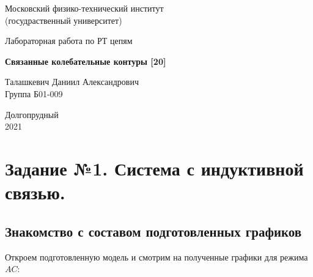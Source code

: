 \documentclass[a4paper, 14pt]{extarticle}%
\date{}
\begin{document}
\begin{titlepage}

	\newpage
	\begin{center}
		\normalsize Московский физико-технический институт \\(госудраственный 			университет)
	\end{center}

	\vspace{6em}

	\begin{center}
		\Large Лабораторная работа по РТ цепям\\
	\end{center}

	\vspace{1em}

	\begin{center}
		\large \textbf{Связанные колебательные контуры [20]}
	\end{center}

	\vspace{2em}

	\begin{center}
		\large Талашкевич Даниил Александрович\\
		Группа Б01-009
	\end{center}

	\vspace{\fill}

	\begin{center}
	Долгопрудный \\2021
	\end{center}
	
\end{titlepage}

	\thispagestyle{empty}
	\newpage
	\tableofcontents
	\newpage
	\setcounter{page}{1}


\section{Задание №1. Система с индуктивной связью.}

\subsection{Знакомство с составом подготовленных графиков}

Откроем подготовленную модель и смотрим на полученные графики для режима $AC$:
\end{document}
